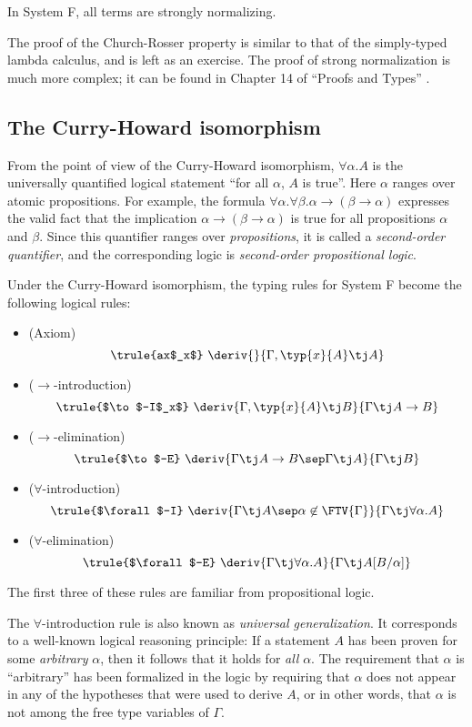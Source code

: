 \documentclass[12pt]{article}
\begin{document}
\begin{theorem}\label{thm-strong-norm-system-f}
  In System F, all terms are strongly normalizing.
\end{theorem}

The proof of the Church-Rosser property is similar to that of the
simply-typed lambda calculus, and is left as an exercise. The proof of
strong normalization is much more complex; it can be found in Chapter
14 of ``Proofs and Types'' {\cite{GLT89}}.

\subsection{The Curry-Howard isomorphism}

From the point of view of the Curry-Howard isomorphism,
$\forall\alpha.A$ is the universally quantified logical statement
``for all $\alpha$, $A$ is true''. Here $\alpha$ ranges over atomic
propositions. For example, the formula
$\forall\alpha.\forall\beta.\alpha\to(\beta\to\alpha)$ expresses the
valid fact that the implication $\alpha\to(\beta\to\alpha)$ is true
for all propositions $\alpha$ and $\beta$. Since this quantifier
ranges over {\em propositions}, it is called a {\em second-order
  quantifier}, and the corresponding logic is {\em second-order
  propositional logic}. 

Under the Curry-Howard isomorphism, the typing rules for System F
become the following logical rules:
\begin{itemize}
\item (Axiom)
\[ \trule{ax$_x$}\ \deriv{}{\Gamma,\typ{x}{A}\tj A}
\]
\item ($\to$-introduction)
\[ \trule{$\to$-I$_x$}\ \deriv{\Gamma,\typ{x}{A}\tj B}{\Gamma\tj A\to B}
\]
\item ($\to$-elimination)
\[ \trule{$\to$-E}\ \deriv{\Gamma\tj A\to B\sep \Gamma\tj A}{\Gamma\tj B}
\]
\item ($\forall$-introduction)
\[ \trule{$\forall$-I}\ \deriv{\Gamma\tj A\sep \alpha\not\in\FTV{\Gamma}}{\Gamma\tj \forall\alpha.A}
\]
\item ($\forall$-elimination)
\[ \trule{$\forall$-E}\ \deriv{\Gamma\tj \forall\alpha.A}{\Gamma\tj A[B/\alpha]}
\]
\end{itemize}
The first three of these rules are familiar from propositional
logic. 

The $\forall$-introduction rule is also known as {\em universal
  generalization}. It corresponds to a well-known logical reasoning
principle: If a statement $A$ has been proven for some {\em arbitrary}
$\alpha$, then it follows that it holds for {\em all} $\alpha$. The
requirement that $\alpha$ is ``arbitrary'' has been formalized in the
logic by requiring that $\alpha$ does not appear in any of the
hypotheses that were used to derive $A$, or in other words, that
$\alpha$ is not among the free type variables of $\Gamma$.
\end{document}

